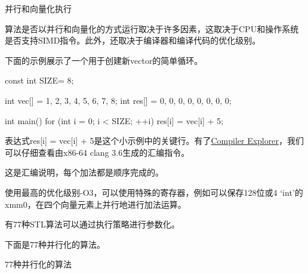 \begin{myTip}{并行和向量化执行}

算法是否以并行和向量化的方式运行取决于许多因素，这取决于CPU和操作系统是否支持SIMD指令。此外，还取决于编译器和编译代码的优化级别。

下面的示例展示了一个用于创建新vector的简单循环。

\begin{cpp}
const int SIZE= 8;

int vec[] = {1, 2, 3, 4, 5, 6, 7, 8};
int res[] = {0, 0, 0, 0, 0, 0, 0, 0};

int main(){
	for (int i = 0; i < SIZE; ++i) {
		res[i] = vec[i] + 5;
	}
}
\end{cpp}

表达式res[i] = vec[i] + 5是这个小示例中的关键行。有了\href{https://godbolt.org/}{Compiler Explorer}，我们可以仔细查看由x86-64 clang 3.6生成的汇编指令。


这是汇编说明，每个加法都是顺序完成的。




使用最高的优化级别-O3，可以使用特殊的寄存器，例如可以保存128位或4 ‘int’的xmm0，在四个向量元素上并行地进行加法运算。


\end{myTip}

有77种STL算法可以通过执行策略进行参数化。


下面是77种并行化的算法。

\begin{center}
77种并行化的算法
\end{center}

